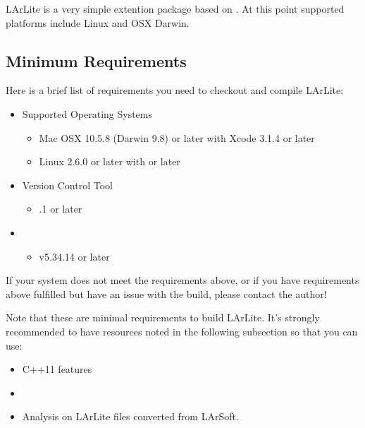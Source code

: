 LArLite is a very simple \CPP extention package based on \ROOT. 
At this point supported platforms include Linux and OSX Darwin. 

\subsection{Minimum Requirements}
Here is a brief list of requirements you need to checkout and compile LArLite:
\begin{itemize}
\item Supported Operating Systems
    \begin{itemize}
    \item Mac OSX 10.5.8 (Darwin 9.8) or later with Xcode 3.1.4 or later
    \item Linux 2.6.0 or later with  or later
    \end{itemize}
\item Version Control Tool
    \begin{itemize}
    \item {}.1 or later
    \end{itemize}
\item \ROOT
    \begin{itemize}
    \item v5.34.14 or later
    \end{itemize}
\end{itemize}

If your system does not meet the requirements above, or if you have requirements above fulfilled but have an issue with the build, please contact the author!

Note that these are minimal requirements to build LArLite. It's strongly recommended to have resources noted in the following subsection so that you can use:
\begin{itemize}
    \item {\ttfamily C++11} features
    \item \PyROOT
    \item Analysis on LArLite files converted from LArSoft.
\end{itemize}


